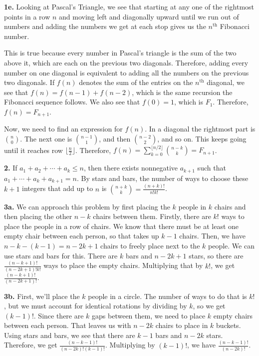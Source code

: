 \documentclass{article}
\begin{document}
\textbf{1e.} Looking at Pascal's Triangle, we see that starting at any one of the rightmost points in a row $n$ and moving left and diagonally upward until we run out of numbers and adding the numbers we get at each stop gives us the $n^{\text{th}}$ Fibonacci number.
\newline

This is true because every number in Pascal's triangle is the sum of the two above it, which are each on the previous two diagonals. Therefore, adding every number on one diagonal is equivalent to adding all the numbers on the previous two diagonals. If $f(n)$ denotes the sum of the entries on the $n^{\text{th}}$ diagonal, we see that $f(n) = f(n - 1) + f(n - 2)$, which is the same recursion the Fibonacci sequence follows. We also see that $f(0) = 1$, which is $F_1$. Therefore, $f(n) = F_{n + 1}$.
\newline

Now, we need to find an expression for $f(n)$. In a diagonal the rightmost part is $n\choose 0$. The next one is ${n - 1}\choose 1$, and then ${n - 2}\choose 2$, and so on. This keeps going until it reaches row $\lfloor \frac{n}{2} \rfloor$. Therefore, $f(n) = \sum_{k = 0}^{\lfloor n/2 \rfloor} {{n - k}\choose k} = F_{n + 1}$.
\newline

\textbf{2.} If $a_1 + a_2 + \cdots + a_k \le n$, then there exists nonnegative $a_{k + 1}$ such that $a_1 + \cdots + a_k + a_{k + 1} = n$. By stars and bars, the number of ways to choose these $k + 1$ integers that add up to $n$ is ${{n + k}\choose k} = \frac{(n + k)!}{n!k!}$.
\newline

\textbf{3a.} We can approach this problem by first placing the $k$ people in $k$ chairs and then placing the other $n - k$ chairs between them. Firstly, there are $k!$ ways to place the people in a row of chairs. We know that there must be at least one empty chair between each person, so that takes up $k - 1$ chairs. Then, we have $n - k - (k - 1) = n - 2k + 1$ chairs to freely place next to the $k$ people. We can use stars and bars for this. There are $k$ bars and $n - 2k + 1$ stars, so there are $\frac{(n - k + 1)!}{(n - 2k + 1)!k!}$ ways to place the empty chairs. Multiplying that by $k!$, we get $\frac{(n - k + 1)!}{(n - 2k + 1)!}$.
\newline

\textbf{3b.} First, we'll place the $k$ people in a circle. The number of ways to do that is $k!$, but we must account for identical rotations by dividing by $k$, so we get $(k - 1)!$. Since there are $k$ gaps between them, we need to place $k$ empty chairs between each person. That leaves us with $n - 2k$ chairs to place in $k$ buckets. Using stars and bars, we see that there are $k - 1$ bars and $n - 2k$ stars. Therefore, we get $\frac{(n - k - 1)!}{(n - 2k)!(k - 1)!}$. Multiplying by $(k - 1)!$, we have $\frac{(n - k - 1)!}{(n - 2k)!}$.
\newline
\end{document}
